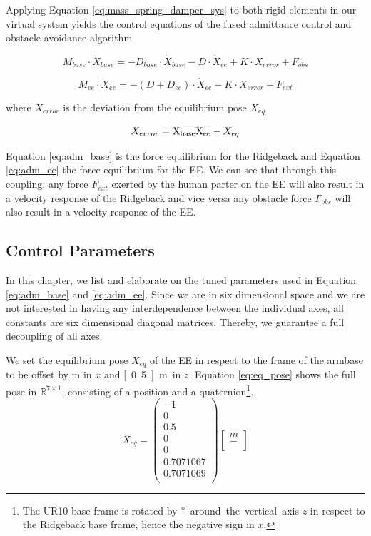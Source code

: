 Applying Equation \ref{eq:mass_spring_damper_sys} to both rigid elements in our virtual system yields the control equations of the fused admittance control and obstacle avoidance algorithm

\begin{equation}
M_{base} \cdot \ddot{X}_{base} = -D_{base} \cdot \dot{X}_{base} - D \cdot \dot{X}_{ee} + K \cdot X_{error}+F_{obs}
	\label{eq:adm_base}
\end{equation}

\begin{equation}
M_{ee} \cdot \ddot{X}_{ee} = -(D + D_{ee}) \cdot \dot{X}_{ee} - K \cdot X_{error}+F_{ext}
	\label{eq:adm_ee}
\end{equation}

where $X_{error}$ is the deviation from the equilibrium pose $X_{eq}$

\begin{equation}
X_{error} = \overline{\rm X_{base}X_{ee}} - X_{eq}
\end{equation}

Equation \ref{eq:adm_base} is the force equilibrium for the Ridgeback and Equation \ref{eq:adm_ee} the force equilibrium for the EE. We can see that through this coupling, any force $F_{ext}$ exerted by the human parter on the EE will also result in a velocity response of the Ridgeback and vice versa any obstacle force $F_{obs}$ will also result in a velocity response of the EE.

\subsection{Control Parameters}
	\label{sec:params}
In this chapter, we list and elaborate on the tuned parameters used in Equation \ref{eq:adm_base} and \ref{eq:adm_ee}. Since we are in six dimensional space and we are not interested in having any interdependence between the individual axes, all constants are six dimensional diagonal matrices. Thereby, we guarantee a full decoupling of all axes.

We set the equilibrium pose $X_{eq}$ of the EE in respect to the frame of the armbase to be offset by \unit[1]{m} in $x$ and \unit[0.5]{m} in $z$. Equation \ref{eq:eq_pose} shows the full pose in $\mathbb{R}^{7 \times 1}$, consisting of a position and a quaternion\footnote{The UR10 base frame is rotated by \unit[180]{$\degree$} around the vertical axis $z$ in respect to the Ridgeback base frame, hence the negative sign in $x$.}.
\begin{equation}
X_{eq} = \begin{pmatrix}
-1 \\ 0 \\ 0.5 \\ 0 \\ 0 \\ 0.7071067 \\ 0.7071069 \\
\end{pmatrix} \begin{bmatrix}
m \\
- \\
\end{bmatrix}
	\label{eq:eq_pose}
\end{equation}

